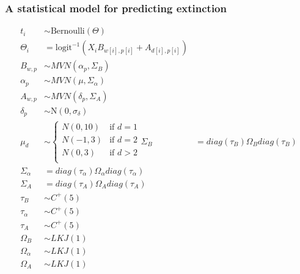 \documentclass{beamer}
\begin{document}
\begin{frame}
  \frametitle{A statistical model for predicting extinction}

  \begin{equation}
    \begin{aligned}
      t_{i} &\sim \text{Bernoulli}(\Theta) \\
      \Theta_{i} &= \text{logit}^{-1} (X_{i} B_{w[i], p[i]} + A_{d[i], p[i]}) \\
      B_{w, p} &\sim MVN(\alpha_{p}, \Sigma_{B}) \\
      \alpha_{p} &\sim MVN(\mu, \Sigma_{\alpha}) \\
      A_{w, p} &\sim MVN(\delta_{p}, \Sigma_{A}) \\
      \delta_{p} &\sim \mathrm{N}(0, \sigma_{\delta}) \\
      \mu_{d} &\sim 
      \begin{cases}
        N(0, 10) & \text{if } d = 1 \\
        N(-1, 3) & \text{if } d = 2 \\
        N(0, 3) & \text{if } d > 2 \\
      \end{cases}
      \Sigma_{B} &= diag(\tau_{B}) \Omega_{B} diag(\tau_{B}) \\
      \Sigma_{\alpha} &= diag(\tau_{\alpha}) \Omega_{\alpha} diag(\tau_{\alpha}) \\
      \Sigma_{A} &= diag(\tau_{A}) \Omega_{A} diag(\tau_{A}) \\
      \tau_{B} &\sim C^{+}(5) \\
      \tau_{\alpha} &\sim C^{+}(5) \\
      \tau_{A} &\sim C^{+}(5) \\
      \Omega_{B} &\sim LKJ(1) \\
      \Omega_{\alpha} &\sim LKJ(1) \\
      \Omega_{A} &\sim LKJ(1) \\
    \end{aligned}
  \end{equation}

\end{frame}
\end{document}
